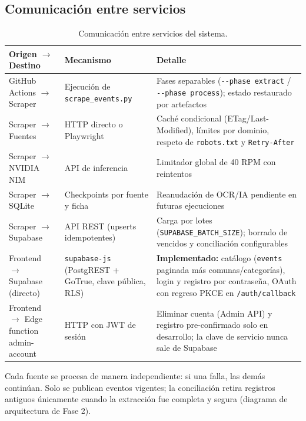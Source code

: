 \subsection{Comunicación entre servicios}

\begin{table}[ht]
\centering\small
\renewcommand{\arraystretch}{1.25}
\begin{tabular}{p{3.4cm} p{4.0cm} p{7.4cm}}
\toprule
\textbf{Origen $\rightarrow$ Destino} & \textbf{Mecanismo} & \textbf{Detalle} \\
\midrule
GitHub Actions $\rightarrow$ Scraper & Ejecución de \texttt{scrape\_events.py} & Fases separables (\texttt{-{}-phase extract} / \texttt{-{}-phase process}); estado restaurado por artefactos \\
Scraper $\rightarrow$ Fuentes & HTTP directo o Playwright & Caché condicional (ETag/Last-Modified), límites por dominio, respeto de \texttt{robots.txt} y \texttt{Retry-After} \\
Scraper $\rightarrow$ NVIDIA NIM & API de inferencia & Limitador global de 40 RPM con reintentos \\
Scraper $\rightarrow$ SQLite & Checkpoints por fuente y ficha & Reanudación de OCR/IA pendiente en futuras ejecuciones \\
Scraper $\rightarrow$ Supabase & API REST (upserts idempotentes) & Carga por lotes (\texttt{SUPABASE\_BATCH\_SIZE}); borrado de vencidos y conciliación configurables \\
Frontend $\rightarrow$ Supabase (directo) & \texttt{supabase-js} (PostgREST + GoTrue, clave pública, RLS) & \textbf{Implementado:} catálogo (\texttt{events} paginada más comunas/categorías), login y registro por contraseña, OAuth con regreso PKCE en \texttt{/auth/callback} \\
Frontend $\rightarrow$ Edge function admin-account & HTTP con JWT de sesión & Eliminar cuenta (Admin API) y registro pre-confirmado solo en desarrollo; la clave de servicio nunca sale de Supabase \\
\bottomrule
\end{tabular}
\caption{Comunicación entre servicios del sistema.}
\label{tab:com}
\end{table}

Cada fuente se procesa de manera independiente: si una falla, las demás continúan. Solo se
publican eventos vigentes; la conciliación retira registros antiguos únicamente cuando la
extracción fue completa y segura (diagrama de arquitectura de Fase 2).

